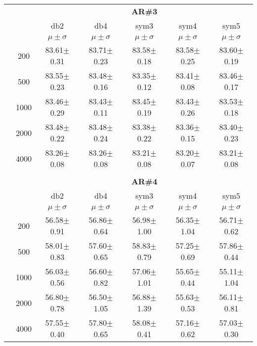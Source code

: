 \begin{table}[H]
\begin{tabular}{|c|c|c c c c c|}

\cline{3-7}
\multicolumn{2}{c|}{\multirow{3}{*}{}} & \multicolumn{5}{c|}{\textbf{AR\#3}}   \\\cline{3-7} 
\multicolumn{2}{c|}{}  & db2 & db4 & sym3 & sym4 & sym5 \\\cline{3-7}%
\multicolumn{2}{c|}{}& $\mu \pm \sigma$ & $\mu \pm \sigma$ & $\mu \pm \sigma$ & $\mu \pm \sigma$ & $\mu \pm \sigma$ \\\hline

\multicolumn{1}{|c|}{ \multirow{5}{*}{\rotatebox[origin=c]{90}{\textbf{Neurônios}}} }
&200	&83.61$\pm$0.31	&83.71$\pm$0.23	&83.58$\pm$0.18	&83.58$\pm$0.25	&83.60$\pm$0.19\\\cline{2-7}
&500	&83.55$\pm$0.23	&83.48$\pm$0.16	&83.35$\pm$0.12	&83.41$\pm$0.08	&83.46$\pm$0.17\\\cline{2-7}
&1000	&83.46$\pm$0.29	&83.43$\pm$0.11	&83.45$\pm$0.19	&83.43$\pm$0.26	&83.53$\pm$0.18\\\cline{2-7}
&2000	&83.48$\pm$0.22	&83.48$\pm$0.24	&83.38$\pm$0.22	&83.36$\pm$0.15	&83.40$\pm$0.23\\\cline{2-7}
&4000	&83.26$\pm$0.08 &83.26$\pm$0.08	&83.21$\pm$0.08	&83.20$\pm$0.07	&83.21$\pm$0.08
	\\ \midrule

\multicolumn{7}{c}{}\\ 



\cline{3-7}
\multicolumn{2}{c|}{\multirow{3}{*}{}} & \multicolumn{5}{c|}{\textbf{AR\#4}}   \\\cline{3-7} 
\multicolumn{2}{c|}{}  & db2 & db4 & sym3 & sym4 & sym5 \\\cline{3-7}%
\multicolumn{2}{c|}{}& $\mu \pm \sigma$ & $\mu \pm \sigma$ & $\mu \pm \sigma$ & $\mu \pm \sigma$ & $\mu \pm \sigma$ \\\hline
\multicolumn{1}{|c|}{ \multirow{5}{*}{\rotatebox[origin=c]{90}{\textbf{Neurônios}}} }
&200	&56.58$\pm$0.91	&56.86$\pm$0.64	&56.98$\pm$1.00	&56.35$\pm$1.04	&56.71$\pm$0.62\\\cline{2-7}
&500	&58.01$\pm$0.83	&57.60$\pm$0.65	&58.83$\pm$0.79	&57.25$\pm$0.69	&57.86$\pm$0.44\\\cline{2-7}
&1000	&56.03$\pm$0.56	&56.60$\pm$0.82	&57.06$\pm$1.01	&55.65$\pm$0.44	&55.11$\pm$1.04\\\cline{2-7}
&2000	&56.80$\pm$0.78	&56.50$\pm$1.05	&56.88$\pm$1.39	&55.63$\pm$0.53	&56.11$\pm$0.81\\\cline{2-7}
&4000	&57.55$\pm$0.40	&57.80$\pm$0.65	&58.08$\pm$0.41	&57.16$\pm$0.62	&57.03$\pm$0.30
\\\midrule
 \end{tabular}

\end{table}



